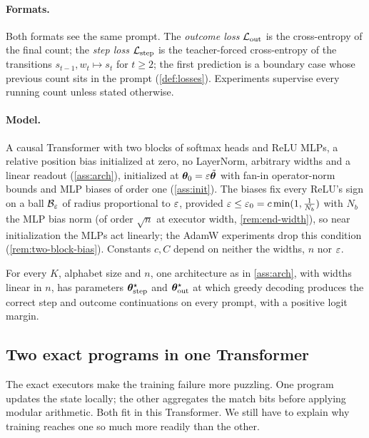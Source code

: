 \paragraph{Formats.} Both formats see the same prompt. The \emph{outcome loss} $\mathcal L_{\mathrm{out}}$ is the cross-entropy of the final
count; the \emph{step loss} $\mathcal L_{\mathrm{step}}$ is the teacher-forced cross-entropy of the transitions $s_{t-1},w_t\mapsto s_t$ for
$t\ge2$; the first prediction is a boundary case whose previous count sits in the prompt (\cref{def:losses}). Experiments
supervise every running count unless stated otherwise.

\paragraph{Model.} A causal Transformer with two blocks of softmax heads and ReLU MLPs, a relative position bias
initialized at zero, no LayerNorm, arbitrary widths and a linear readout (\cref{ass:arch}), initialized at
$\bm\theta_0=\varepsilon\tilde{\bm\theta}$ with fan-in operator-norm bounds and MLP biases of order one (\cref{ass:init}). The biases fix
every ReLU's sign on a ball $\mathcal B_{\varepsilon}$ of radius proportional to $\varepsilon$, provided
$\varepsilon\le\varepsilon_0=c\min(1,\frac{1}{N_b})$ with $N_b$ the MLP bias norm (of order $\sqrt n$ at executor width, \cref{rem:end-width}), so near initialization the MLPs act linearly;
the AdamW experiments drop this condition (\cref{rem:two-block-bias}). Constants $c,C$ depend on neither the widths, $n$ nor
$\varepsilon$.

\begin{proposition}
\label{prop:represent}
For every $K$, alphabet size and $n$, one architecture as in \cref{ass:arch}, with widths linear in $n$, has parameters
$\bm\theta^\star_{\mathrm{step}}$ and $\bm\theta^\star_{\mathrm{out}}$ at which greedy decoding produces the correct step and outcome continuations on every prompt, with
a positive logit margin.
\end{proposition}

\subsection{Two exact programs in one Transformer}
\label{sec:exact-programs}
The exact executors make the training failure more puzzling. One program updates the state locally; the other aggregates the match
bits before applying modular arithmetic. Both fit in this Transformer. We still have to explain why training reaches one so much
more readily than the other.

